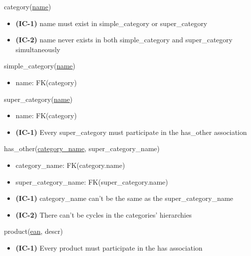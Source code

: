\documentclass[12pt,a4paper]{article}
\begin{document}
  \vspace*{10pt}

  \noindent
  category(\underline{name})
  \begin{itemize}[nosep]
    \item \textsf{\textbf{(IC-1)}} name \textsf{must exist in} simple\_category \textsf{or} super\_category
    \item \textsf{\textbf{(IC-2)}} name \textsf{never exists in both} simple\_category \textsf{and} super\_category \textsf{simultaneously}
  \end{itemize}

  \vspace*{10pt}

  \noindent
  simple\_category(\underline{name})
  \begin{itemize}[nosep]
    \item name: FK(category)
  \end{itemize}

  \vspace*{10pt}

  \noindent
  super\_category(\underline{name})
  \begin{itemize}[nosep]
    \item name: FK(category)
    \item \textsf{\textbf{(IC-1)} Every} super\_category \textsf{must participate in the} has\_other \textsf{association}
  \end{itemize}

  \vspace*{10pt}

  \noindent
  has\_other(\underline{category\_name}, super\_category\_name)
  \begin{itemize}[nosep]
    \item category\_name: FK(category.name)
    \item super\_category\_name: FK(super\_category.name)
    \item \textsf{\textbf{(IC-1)}} category\_name \textsf{can't be the same as the} super\_category\_name
    \item \textsf{\textbf{(IC-2)} There can't be cycles in the categories' hierarchies}
  \end{itemize}

  \vspace*{10pt}

  \noindent
  product(\underline{ean}, descr)
  \begin{itemize}
    \item \textsf{\textbf{(IC-1)} Every} product \textsf{must participate in the} has \textsf{association}
  \end{itemize}
\end{document}
